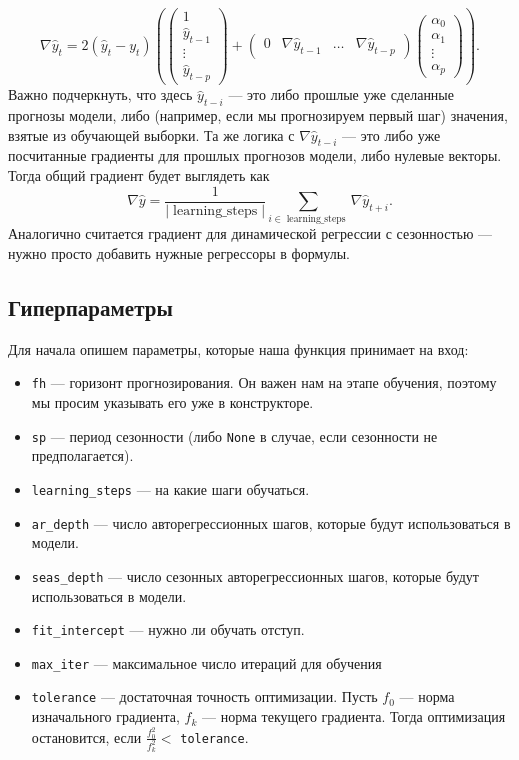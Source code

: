 \documentclass[a4paper,14pt]{extarticle}
\begin{document}
	\begin{equation*}
		\nabla \hat{y}_t = 2 (\hat{y}_{t} - y_{t}) \left( \begin{pmatrix}
			1 \\
			\hat{y}_{t-1} \\
			\vdots \\
			\hat{y}_{t-p}
		\end{pmatrix} + \left( \begin{array}{c|c|c|c}
			0 & \nabla \hat{y}_{t-1} & \dots & \nabla\hat{y}_{t-p}
		\end{array} \right) \begin{pmatrix}
			\alpha_0 \\
			\alpha_1 \\
			\vdots \\
			\alpha_p
		\end{pmatrix} \right).
	\end{equation*}
	Важно подчеркнуть, что здесь $\hat{y}_{t-i}$ --- это либо прошлые уже сделанные прогнозы модели, либо (например, если мы прогнозируем первый шаг) значения, взятые из обучающей выборки. Та же логика с $\nabla \hat{y}_{t-i}$ --- это либо уже посчитанные градиенты для прошлых прогнозов модели, либо нулевые векторы. Тогда общий градиент будет выглядеть как 
	\begin{equation*}
		\nabla \hat{y} = \frac{1}{|\operatorname{learning\_steps}|}\sum_{i \in \operatorname{learning\_steps}} \nabla\hat{y}_{t + i}.
	\end{equation*}
	Аналогично считается градиент для динамической регрессии с сезонностью --- нужно просто добавить нужные регрессоры в формулы.
	\subsection{Гиперпараметры}
	Для начала опишем параметры, которые наша функция принимает на вход:
	\begin{itemize}
		\item \texttt{fh} --- горизонт прогнозирования. Он важен нам на этапе обучения, поэтому мы просим указывать его уже в конструкторе.
  		\item \texttt{sp} --- период сезонности (либо \texttt{None} в случае, если сезонности не предполагается).
  		\item \texttt{learning\_steps} --- на какие шаги обучаться.
  		\item \texttt{ar\_depth} --- число авторегрессионных шагов, которые будут использоваться в модели.
  		\item \texttt{seas\_depth} --- число сезонных авторегрессионных шагов, которые будут использоваться в модели.
  		\item \texttt{fit\_intercept} --- нужно ли обучать отступ.
  		\item \texttt{max\_iter} --- максимальное число итераций для обучения
  		\item \texttt{tolerance} --- достаточная точность оптимизации. Пусть $f_0$ --- норма изначального градиента, $f_k$ --- норма текущего градиента. Тогда оптимизация остановится, если $\frac{f_0^2}{f_k^2} <$ \texttt{tolerance}.
	\end{itemize}
\end{document}
